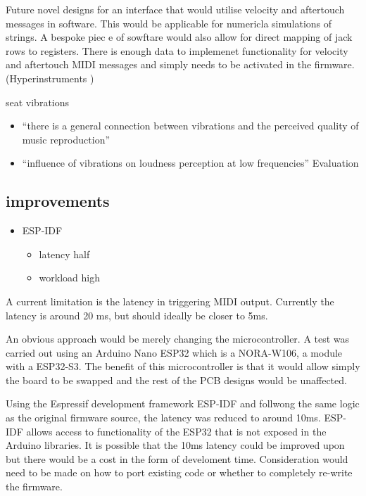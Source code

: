 Future novel designs for an interface that would utilise velocity and
aftertouch messages in software. This would be applicable for numericla
simulations of strings. A bespoke piec e of sowftare would also allow
for direct mapping of jack rows to registers. There is enough data to
implemenet functionality for velocity and aftertouch MIDI messages and
simply needs to be activated in the firmware. (Hyperinstruments
\cite{nime2024_20})

seat vibrations \cite{MusicalHaptics2018_07}

\begin{itemize}
\item
  ``there is a general connection between vibrations and the perceived
  quality of music reproduction''
\item
  ``influence of vibrations on loudness perception at low frequencies''
  Evaluation
\end{itemize}

\subsection{improvements}\label{improvements}

\begin{itemize}
\item
  ESP-IDF

  \begin{itemize}
  \item
    latency half
  \item
    workload high
  \end{itemize}
\end{itemize}

A current limitation is the latency in triggering MIDI output. Currently
the latency is around 20 ms, but should ideally be closer to 5ms.

An obvious approach would be merely changing the microcontroller. A test
was carried out using an Arduino Nano ESP32 which is a NORA-W106, a
module with a ESP32-S3. The benefit of this microcontroller is that it
would allow simply the board to be swapped and the rest of the PCB
designs would be unaffected.

Using the Espressif development framework ESP-IDF and follwong the same
logic as the original firmware source, the latency was reduced to around
10ms. ESP-IDF allows access to functionality of the ESP32 that is not
exposed in the Arduino libraries. It is possible that the 10ms latency
could be improved upon but there would be a cost in the form of
develoment time. Consideration would need to be made on how to port
existing code or whether to completely re-write the firmware.

